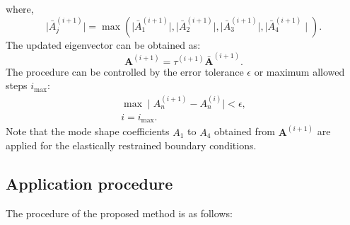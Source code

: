 \documentclass[preprint,12pt]{elsarticle}
\begin{document}
%
where,
%
\begin{equation}\label{eq:updatetau}
	\mid \bar{A}_j^{(i+1)} \mid = \max(\mid \bar{A}_1^{(i+1)} \mid, \mid \bar{A}_2^{(i+1)} \mid, \mid\bar{A}_3^{(i+1)}\mid , \mid \bar{A}_4^{(i+1)} \mid).
\end{equation}
%
The updated eigenvector can be obtained as:
%
\begin{equation}\label{eq:updateeigenvalue}
	\mathbf{A}^{(i+1)} = \tau^{(i+1)} \bar{\mathbf{A}}^{(i+1)}.
\end{equation}
%
The procedure can be controlled by the error tolerance \( \epsilon \) or maximum allowed steps \( i_{\text{max}} \):
%
\begin{subequations}
	\begin{align}
		\max \mid A_n^{(i+1)} - A_n^{(i)} \mid < \epsilon, \\ 
		i = i_{\text{max}}.
	\end{align}
\end{subequations}
%
Note that the mode shape coefficients \( A_1 \) to \( A_4 \) obtained from \(\mathbf{A}^{(i+1)}\) are applied for the elastically restrained boundary conditions.

\subsection{Application procedure}
The procedure of the proposed method is as follows:   
\end{document}

